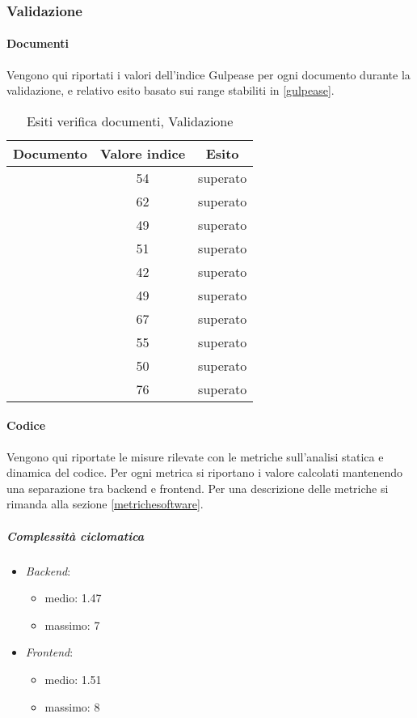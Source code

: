 \subsubsection{Validazione}
	\paragraph{Documenti}
	 Vengono qui riportati i valori dell’indice Gulpease per ogni documento durante la validazione, e relativo esito basato sui range stabiliti in \ref{gulpease}.
	
	\begin{table}[H]
	\centering
	\begin{tabular}{ | c | c | c | }
    \hline
    Documento & Valore indice & Esito \\ \hline
    \AnalisiDeiRequisiti{} & 54 & superato  \\ \hline
    \DefinizioneDiProdotto{} & 62 & superato  \\ \hline
    \Glossario{} & 49 & superato  \\ \hline
    \ManualeAdmin{} & 51 & superato  \\ \hline
    \ManualeSviluppatore{} & 42 & superato  \\ \hline
    \ManualeUtente{} & 49 & superato  \\ \hline
    \NormeDiProgetto{} & 67 & superato  \\ \hline
    \PianoDiProgetto{} & 55 & superato  \\ \hline
    \PianoDiQualifica{} & 50 & superato  \\ \hline
    \SpecificaTecnica{} & 76 & superato \\ \hline
    \end{tabular}
	\caption{Esiti verifica documenti, Validazione}
	\end{table}
	
	\paragraph{Codice}
	Vengono qui riportate le misure rilevate con le metriche sull'analisi statica e dinamica del codice. Per ogni metrica si riportano i valore calcolati mantenendo una separazione tra backend e frontend. Per una descrizione delle metriche si rimanda alla sezione \ref{metrichesoftware}.

	\subparagraph{Complessità ciclomatica}
	\begin{itemize}
		\item \emph{Backend}: 
		\begin{itemize}
			\item medio: 1.47
			\item massimo: 7
		\end{itemize} 
		\item \emph{Frontend}: 
		\begin{itemize}
			\item medio: 1.51
			\item massimo: 8
		\end{itemize} 
	\end{itemize}


